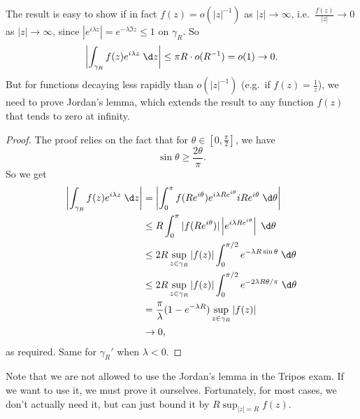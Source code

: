 \documentclass[a4paper]{article}
\begin{document}
The result is easy to show if in fact $f(z) = o(|z|^{-1})$ as $|z| \to \infty$, i.e.\ $\frac{f(z)}{|z|} \to 0$ as $|z|\to \infty$, since $|e^{i\lambda z}| = e^{-\lambda \Im z} \leq 1$ on $\gamma_R$. So
\[
  \left|\int_{\gamma_R} f(z) e^{i \lambda z}\;\d z\right| \leq \pi R \cdot o(R^{-1}) = o(1) \to 0.
\]
But for functions decaying less rapidly than $o(|z|^{-1})$ (e.g.\ if $f(z) = \frac{1}{z}$), we need to prove Jordan's lemma, which extends the result to any function $f(z)$ that tends to zero at infinity.
\begin{proof}
  The proof relies on the fact that for $\theta \in \left[0, \frac{\pi}{2}\right]$, we have
  \[
    \sin \theta \geq \frac{2\theta}{\pi}.
  \]
  So we get
  \begin{align*}
    \left|\int_{\gamma_R} f(z) e^{i\lambda z}\;\d z\right| &= \left|\int_0^\pi f(Re^{i\theta}) e^{i\lambda Re^{i\theta}} i R e^{i\theta}\;\d \theta\right|\\
    &\leq R\int_0^\pi |f(Re^{i\theta})| \left|e^{i\lambda R e^{i\theta}}\right|\;\d \theta\\
    &\leq 2R\sup_{z \in \gamma_R} |f(z)| \int_0^{\pi/2} e^{-\lambda R \sin \theta}\;\d \theta\\
    &\leq 2R\sup_{z \in \gamma_R} |f(z)| \int_0^{\pi/2} e^{-2\lambda R \theta/\pi}\;\d \theta\\
    &= \frac{\pi}{\lambda}(1 - e^{-\lambda R}) \sup_{z \in \gamma_R}|f(z)|\\
    &\to 0,
  \end{align*}
  as required. Same for $\gamma_R'$ when $\lambda < 0$.
\end{proof}
Note that we are not allowed to use the Jordan's lemma in the Tripos exam. If we want to use it, we must prove it ourselves. Fortunately, for most cases, we don't actually need it, but can just bound it by $R \sup_{|z| = R} f(z)$.
\end{document}
